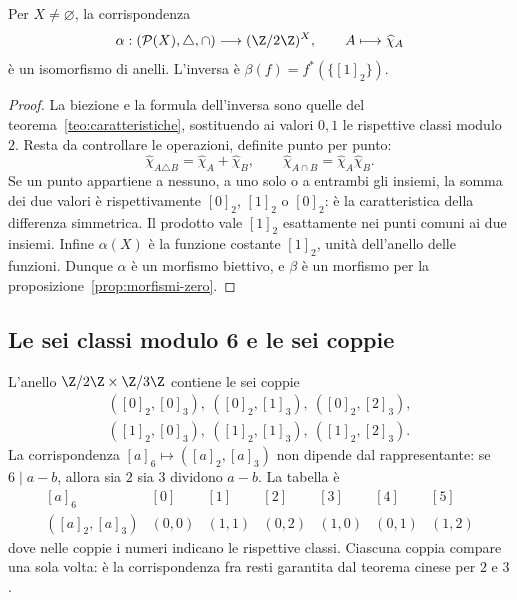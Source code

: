 \begin{proposizione}
Per $X\ne\varnothing$, la corrispondenza
\[
\alpha:(\mathcal P(X),\triangle,\cap)\longrightarrow(\Z/2\Z)^X,
\qquad A\longmapsto\widehat\chi_A
\]
è un isomorfismo di anelli. L'inversa è $\beta(f)=f^*(\{[1]_2\})$.
\end{proposizione}
\begin{proof}
La biezione e la formula dell'inversa sono quelle del teorema~\ref{teo:caratteristiche}, sostituendo ai valori $0,1$ le rispettive classi modulo $2$. Resta da controllare le operazioni, definite punto per punto:
\[
\widehat\chi_{A\triangle B}=\widehat\chi_A+\widehat\chi_B,
\qquad \widehat\chi_{A\cap B}=\widehat\chi_A\widehat\chi_B.
\]
Se un punto appartiene a nessuno, a uno solo o a entrambi gli insiemi, la somma dei due valori è rispettivamente $[0]_2$, $[1]_2$ o $[0]_2$: è la caratteristica della differenza simmetrica. Il prodotto vale $[1]_2$ esattamente nei punti comuni ai due insiemi. Infine $\alpha(X)$ è la funzione costante $[1]_2$, unità dell'anello delle funzioni. Dunque $\alpha$ è un morfismo biettivo, e $\beta$ è un morfismo per la proposizione~\ref{prop:morfismi-zero}.
\end{proof}

\subsection{Le sei classi modulo 6 e le sei coppie}
L'anello $\Z/2\Z\times\Z/3\Z$ contiene le sei coppie
\[
\begin{gathered}
([0]_2,[0]_3),\ ([0]_2,[1]_3),\ ([0]_2,[2]_3),\\
([1]_2,[0]_3),\ ([1]_2,[1]_3),\ ([1]_2,[2]_3).
\end{gathered}
\]
La corrispondenza $[a]_6\mapsto([a]_2,[a]_3)$ non dipende dal rappresentante: se $6\mid a-b$, allora sia $2$ sia $3$ dividono $a-b$. La tabella è
\[
\begin{array}{c|cccccc}
[a]_6&[0]&[1]&[2]&[3]&[4]&[5]\\\hline
([a]_2,[a]_3)&(0,0)&(1,1)&(0,2)&(1,0)&(0,1)&(1,2)
\end{array}
\]
dove nelle coppie i numeri indicano le rispettive classi. Ciascuna coppia compare una sola volta: è la corrispondenza fra resti garantita dal teorema cinese per $2$ e $3$.

